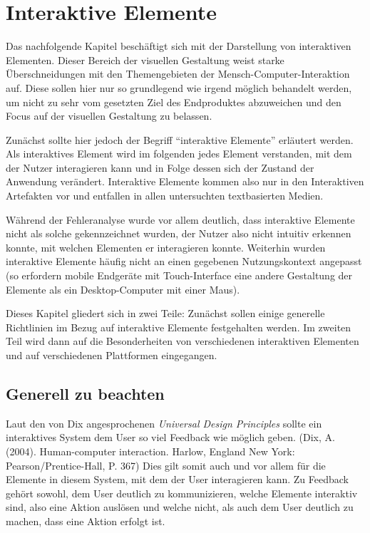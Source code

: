 
\chapter{Interaktive Elemente} %

\label{Interaktive-Elemente} %



Das nachfolgende Kapitel beschäftigt sich mit der Darstellung von interaktiven Elementen. Dieser Bereich der visuellen Gestaltung weist starke Überschneidungen mit den Themengebieten der Mensch-Computer-Interaktion auf. Diese sollen hier nur so grundlegend wie irgend möglich behandelt werden, um nicht zu sehr vom gesetzten Ziel des Endproduktes abzuweichen und den Focus auf der visuellen Gestaltung zu belassen.

Zunächst sollte hier jedoch der Begriff “interaktive Elemente” erläutert werden. Als interaktives Element wird im folgenden jedes Element verstanden, mit dem der Nutzer interagieren kann und in Folge dessen sich der Zustand der Anwendung verändert. Interaktive Elemente kommen also nur in den Interaktiven Artefakten vor und entfallen in allen untersuchten textbasierten Medien.

Während der Fehleranalyse wurde vor allem deutlich, dass interaktive Elemente nicht als solche gekennzeichnet wurden, der Nutzer also nicht intuitiv erkennen konnte, mit welchen Elementen er interagieren konnte. Weiterhin wurden interaktive Elemente häufig nicht an einen gegebenen Nutzungskontext angepasst (so erfordern mobile Endgeräte mit Touch-Interface eine andere Gestaltung der Elemente als ein Desktop-Computer mit einer Maus).

Dieses Kapitel gliedert sich in zwei Teile: Zunächst sollen einige generelle Richtlinien im Bezug auf interaktive Elemente festgehalten werden. Im zweiten Teil wird dann auf die Besonderheiten von verschiedenen interaktiven Elementen und auf verschiedenen Plattformen eingegangen.

\section{Generell zu beachten}
Laut den von Dix angesprochenen \textit{Universal Design Principles} sollte ein interaktives System dem User so viel Feedback wie möglich geben. (Dix, A. (2004). Human-computer interaction. Harlow, England New York: Pearson/Prentice-Hall, P. 367) Dies gilt somit auch und vor allem für die Elemente in diesem System, mit dem der User interagieren kann.
Zu Feedback gehört sowohl, dem User deutlich zu kommunizieren, welche Elemente interaktiv sind, also eine Aktion auslösen und welche nicht, als auch dem User deutlich zu machen, dass eine Aktion erfolgt ist.

